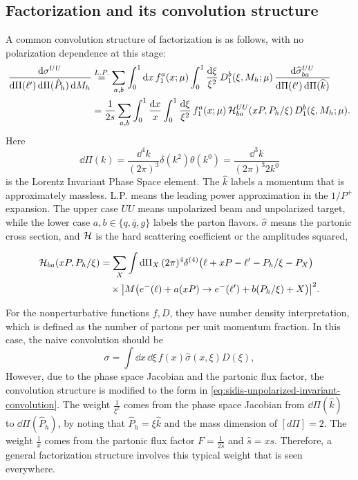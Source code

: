 \documentclass[a4paper,11pt]{article}
\begin{document}
\subsection{Factorization and its convolution structure}
A common convolution structure of factorization is as follows, with no polarization dependence at this stage:
\begin{equation}
    \begin{aligned}
        \frac{\dd\sigma^{UU}}{\dd\Pi(\ell')\,\dd\Pi(\hat P_h)\,\dd M_h}
        &\overset{L.P.}{=} \sum_{a,b}\int_0^1\dd x\, f_1^a(x;\mu)
                  \int_0^1\frac{\dd\xi}{\xi^2}\,D_1^b(\xi,M_h;\mu)\,
                  \frac{\dd\widehat\sigma^{UU}_{ba}}
                       {\dd\Pi(\ell')\,\dd\Pi(\widehat k)}\\
        &= \frac{1}{2s}\sum_{a,b}\int_0^1\frac{\dd x}{x}
                  \int_0^1\frac{\dd\xi}{\xi^2}\,
                  f_1^a(x;\mu)\,{\cal H}^{UU}_{ba}(xP, P_h/\xi)\,D_1^b(\xi,M_h;\mu).
    \end{aligned}
    \label{eq:sidis-unpolarized-invariant-convolution}
\end{equation}
Here $$\dd \Pi(k) = \frac{\dd^4 k}{(2\pi)^3} \delta(k^2) \theta(k^0) = \frac{\dd^3k}{(2\pi)^3 2k^0}$$ is the Lorentz Invariant Phase Space element. The $\hat k$ labels a momentum that is approximately massless. L.P. means the leading power approximation in the $1/P^+$ expansion.
The upper case $UU$ means unpolarized beam and unpolarized target, while the lower case $a,b \in \{q,\bar q,g\}$ labels the parton flavors.
$\hat \sigma$ means the partonic cross section, and ${\cal H}$ is the hard scattering coefficient or the amplitudes squared, 

\begin{equation}
    \begin{aligned}
        {\cal H}_{ba}(xP,P_h/\xi)
        &=\sum_X\int\dd\Pi_X\, (2\pi)^4
          \delta^{(4)}\bigl(\ell+xP-\ell'-P_h/\xi-P_X\bigr)\\
        &\quad\times
          \abs{M\bigl(e^-(\ell)+a(xP)\to e^-(\ell')+
                      b(P_h/\xi)+X\bigr)}^2 .
    \end{aligned}
    \label{eq:sidis-hard-scattering}
\end{equation}


For the nonperturbative functions $f,D$, they have number density interpretation, which is defined as the number of partons per unit momentum fraction.
In this case, the naive convolution should be 
$$
\sigma = \int \dd x \, \dd \xi \, f(x) \hat \sigma(x,\xi) D(\xi) ,
$$
However, due to the phase space Jacobian and the partonic flux factor, the convolution structure is modified to the form in \eqref{eq:sidis-unpolarized-invariant-convolution}.
The weight $\frac{1}{\xi^2}$ comes from the phase space Jacobian from $\dd\Pi(\hat k)$ to $\dd\Pi(\hat P_h)$, by noting that $\hat P_h = \xi \hat k$ and the mass dimension of $[d\Pi]=2$.
The weight $\frac{1}{x}$ comes from the partonic flux factor $F=\frac{1}{2\hat s}$ and $\hat s = x s$.
Therefore, a general factorization structure involves this typical weight that is seen everywhere.
\end{document}

